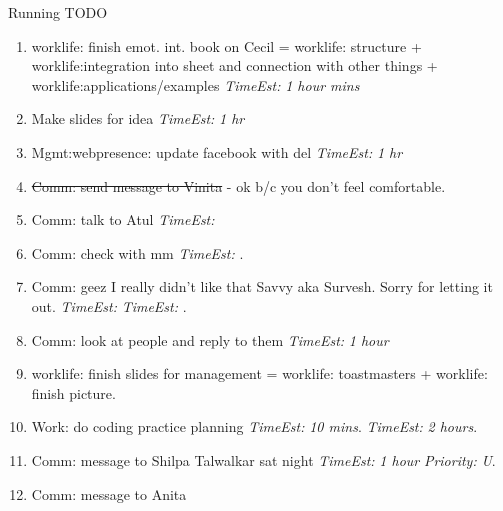 \documentclass[serif, mathserif, final]{beamer}
\newcommand{\doneTask}[1]{\tiny \item \tiny \sout{#1}}
\newcommand{\te}[1]{\textit{TimeEst:} \textit{#1}}
\newcommand{\prio}[1]{\textit{Priority:} \textit{#1}}
\newcommand{\dl}[1]{#1}
\begin{document}
\begin{frame}
\begin{columns}
\begin{column}{0.50\linewidth}
\begin{block}{Running TODO}
\begin{enumerate}
      
        \item \small worklife: finish emot. int. book  on Cecil =
          worklife: structure + worklife:integration into sheet and
          connection with other things +
          worklife:applications/examples \te{1 hour mins}
          
        \item \small Make slides for idea \te{1 hr }

        \item \small Mgmt:webpresence: update facebook with del \te{1 hr}
        \doneTask{Comm: send message to Vinita} - ok b/c you don't
        feel comfortable.  
      \item \small Comm: talk to Atul \te{} 

      \item \small Comm: check with mm \te{}. 

      \item \small Comm: geez I really didn't like that Savvy aka
        Survesh. Sorry for letting it out. \te{} \te{}. 

      \item \small Comm: look at people and reply to them \te{1 hour}



      \item \small worklife: finish slides for management =
        worklife: toastmasters + worklife: finish picture.  
        
      \item \small Work: do coding practice planning \te{10 mins}. \te{2 hours}. 
        
      \item \small Comm: message to Shilpa Talwalkar \dl{sat night} \te{1 hour} \prio{U}.
      
      \item \small Comm: message to Anita
          
        \end{enumerate}
      \end{block} 
      

\end{column}
\end{columns}
\end{frame}
\end{document}
